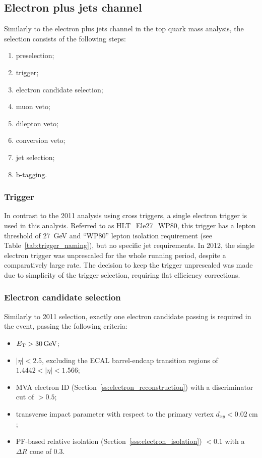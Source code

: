 \subsection{Electron plus jets channel}
\label{ss_xsection:ejets}

Similarly to the electron plus jets channel in the top quark mass analysis, the selection consists of the following
steps:

\begin{enumerate}[topsep=\parskip, parsep=\parskip, itemsep=\parskip, leftmargin=\leftmargin]
	\item preselection;
	\item trigger;
	\item electron candidate selection;
	\item muon veto;
	\item dilepton veto;
	\item conversion veto;
	\item jet selection;
	\item b-tagging.
\end{enumerate}


\subsubsection*{Trigger}
In contrast to the 2011 analysis using cross triggers, a single electron trigger is used in this analysis. Referred to
as HLT\_Ele27\_WP80, this trigger has a lepton \pt threshold of \SI{27}{\GeV} and ``WP80'' lepton isolation requirement
(see Table~\ref{tab:trigger_naming}), but no specific jet requirements. In 2012, the single electron trigger was
unprescaled for the whole running period, despite a comparatively large rate. The decision to keep the trigger
unprescaled was made due to simplicity of the trigger selection, requiring flat efficiency corrections.

\subsubsection*{Electron candidate selection}
Similarly to 2011 selection, exactly one electron candidate passing is required in the event, passing the following
criteria:

\begin{itemize}
	\item $\ET > \SI{30}{\GeV}$;
	\item $|\eta| < 2.5$, excluding the ECAL barrel-endcap transition regions of $1.4442 < |\eta| < 1.566$;
	\item MVA electron ID (Section~\ref{ss:electron_reconstruction}) with a discriminator cut of $>0.5$;
	\item transverse impact parameter with respect to the primary vertex $d_{xy} < \SI{0.02}{\cm}$;
	\item PF-based relative isolation (Section~\ref{sss:electron_isolation}) \reliso $< 0.1$ with a $\Delta
R$ cone of \num{0.3}.
\end{itemize}

